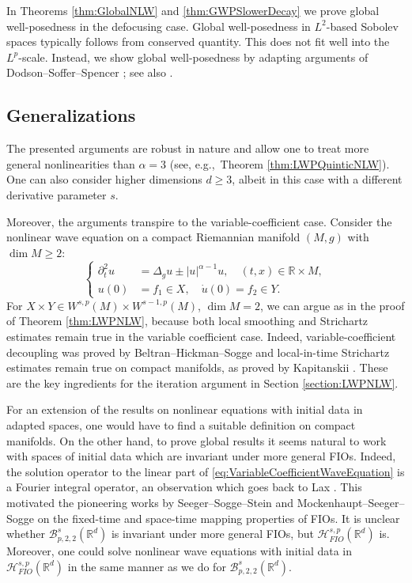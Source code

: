 \documentclass{amsart}
\theoremstyle{definition}
\newcommand{\R}{\mathbb{R}}
\newcommand {\Rd}{\mathbb{R}^{d}}
\newcommand {\Hps}{\mathcal{H}^{s,p}_{FIO}(\Rd)}
\numberwithin{equation}{section}
\begin{document}
In Theorems \ref{thm:GlobalNLW} and \ref{thm:GWPSlowerDecay} we prove global well-posedness in the defocusing case. Global well-posedness in $L^2$-based Sobolev spaces typically follows from conserved quantity. This does not fit well into the $L^p$-scale. Instead, we show global well-posedness by adapting arguments of Dodson--Soffer--Spencer \cite{DodsonSofferSpencer2021}; see also \cite{Schippa2022,KlausKunstmann2021}. 




\subsection*{Generalizations}

The presented arguments are robust in nature and allow one to treat more general nonlinearities than $\alpha=3$ (see, e.g.,~Theorem \ref{thm:LWPQuinticNLW}). One can also consider higher dimensions $d \geq 3$, albeit in this case with a different derivative parameter $s$. 


Moreover, the arguments transpire to the variable-coefficient case. Consider the nonlinear wave equation on a compact Riemannian manifold $(M,g)$ with $\dim M \geq 2$:
\begin{equation}
\label{eq:VariableCoefficientWaveEquation}
\begin{cases}
\partial_t^2 u &= \Delta_g u \pm |u|^{\alpha - 1} u, \quad (t,x) \in \R \times M, \\
u(0) &= f_1 \in X, \quad \dot{u}(0) = f_2 \in Y.
\end{cases}
\end{equation}
For $X \times Y \in W^{s,p}(M) \times W^{s-1,p}(M)$, $\dim M =2$, we can argue as in the proof of Theorem \ref{thm:LWPNLW}, because both local smoothing and Strichartz estimates remain true in the variable coefficient case. Indeed, variable-coefficient decoupling was proved by Beltran--Hickman--Sogge \cite{BeltranHickmanSogge2020} and local-in-time Strichartz estimates remain true on compact manifolds, as proved by Kapitanskii \cite{Kapitanskii1989,Kapitanskii1989II}. These are the key ingredients for the iteration argument in Section \ref{section:LWPNLW}. 

For an extension of the results on nonlinear equations with initial data in adapted spaces, one would have to find a suitable definition on compact manifolds. On the other hand, to prove global results it seems natural to work with spaces of initial data which are invariant under more general FIOs. Indeed, the solution operator to the linear part of \eqref{eq:VariableCoefficientWaveEquation} is a Fourier integral operator, an observation which goes back to Lax \cite{Lax1957}. This motivated the pioneering works by Seeger--Sogge--Stein \cite{SeegerSoggeStein1991} and Mockenhaupt--Seeger--Sogge \cite{MockenhauptSeegerSogge1993} on the fixed-time and space-time mapping properties of FIOs.  It is unclear whether $\mathcal{B}^s_{p,2,2}(\Rd)$ is invariant under more general FIOs, but $\Hps$ is. Moreover, one could solve nonlinear wave equations with initial data in $\Hps$ in the same manner as we do for $\mathcal{B}^s_{p,2,2}(\Rd)$.
\end{document}
